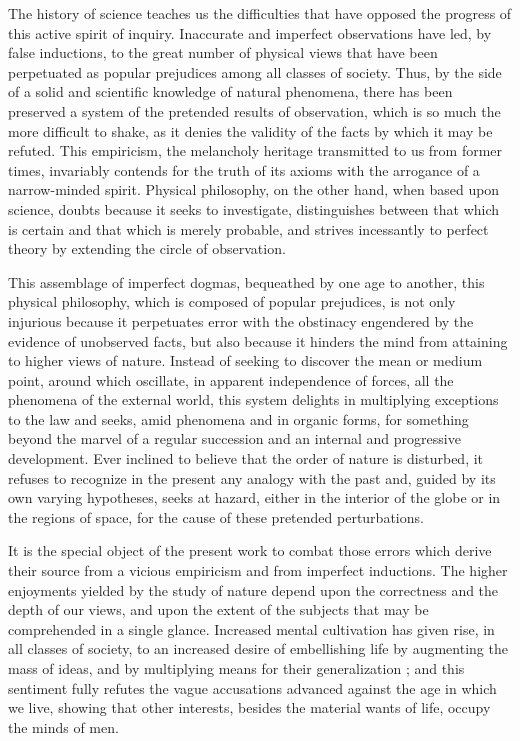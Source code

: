 The history of science teaches us the difficulties that have opposed the progress of this active spirit of inquiry. Inaccurate and imperfect observations have led, by false inductions, to the great number of physical views that have been perpetuated as popular prejudices among all classes of society. Thus, by the side of a solid and scientific knowledge of natural phenomena, there has been preserved a system of the pretended results of observation, which is so much the more difficult to shake, as it denies the validity of the facts by which it may be refuted. This empiricism, the melancholy heritage transmitted to us from former times, invariably contends for the truth of its axioms with the arrogance of a narrow-minded spirit. Physical philosophy, on the other hand, when based upon science, doubts because it seeks to investigate, distinguishes between that which is certain and that which is merely probable, and strives incessantly to perfect theory by extending the circle of observation.

This assemblage of imperfect dogmas, bequeathed by one age to another, this physical philosophy, which is composed of popular prejudices, is not only injurious because it perpetuates error with the obstinacy engendered by the evidence of unobserved facts, but also because it hinders the mind from attaining to higher views of nature. Instead of seeking to discover the mean or medium point, around which oscillate, in apparent independence of forces, all the phenomena of the external world, this system delights in multiplying exceptions to the law and seeks, amid phenomena and in organic forms, for something beyond the marvel of a regular succession and an internal and progressive development. Ever inclined to believe that the order of nature is disturbed, it refuses to recognize in the present any analogy with the past and, guided by its own varying hypotheses, seeks at hazard, either in the interior of the globe or in the regions of space, for the cause of these pretended perturbations.

It is the special object of the present work to combat those errors which derive their source from a vicious empiricism and from imperfect inductions. The higher enjoyments yielded by the study of nature depend upon the correctness and the depth of our views, and upon the extent of the subjects that may be comprehended in a single glance. Increased mental cultivation has given rise, in all classes of society, to an increased desire of embellishing life by augmenting the mass of ideas, and by multiplying means for their generalization ; and this sentiment fully refutes the vague accusations advanced against the age in which we live, showing that other interests, besides the material wants of life, occupy the minds of men.

